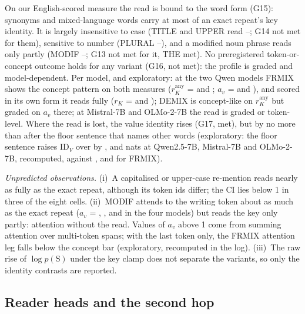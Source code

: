On our English-scored measure the read is bound to the word form (G15): synonyms and mixed-language words carry at most \GfifteenRKMax{} of an exact repeat's key identity. It is largely insensitive to case (TITLE and UPPER read \GfourteenCaseMin{}--\GfourteenCaseMax{}; G14 not met for them), sensitive to number (PLURAL \GfourteenPluralMin{}--\GfourteenPluralMax{}), and a modified noun phrase reads only partly (MODIF \GthirteenModifMin{}--\GthirteenModifMax{}; G13 not met for it, THE met). No preregistered token-or-concept outcome holds for any variant (G16, not met): the profile is graded and model-dependent. Per model, and exploratory: at the two Qwen models FRMIX shows the concept pattern on both measures ($r_K^{\mathrm{any}}$ = \GdRKanyFrmixQwenSeven{} and \GdRKanyFrmixQwenFourteen{}; $a_v$ = \GdAvFrmixQwenSeven{} and \GdAvFrmixQwenFourteen{}), and scored in its own form it reads fully ($r_K$ = \GdRKformFrmixQwenSeven{} and \GdRKformFrmixQwenFourteen{}); DEMIX is concept-like on $r_K^{\mathrm{any}}$ but graded on $a_v$ there; at Mistral-7B and OLMo-2-7B the read is graded or token-level. Where the read is lost, the value identity rises (G17, met), but by no more than after the floor sentence that names other words (exploratory: the floor sentence raises $\mathrm{ID}_V$ over \fmtPost{} by \GdOtherCompQwenSeven{}, \GdOtherCompMistralSeven{} and \GdOtherCompOlmoSeven{} nats at Qwen2.5-7B, Mistral-7B and OLMo-2-7B, recomputed, against \GseventeenFrmixQwenSeven{}, \GseventeenFrmixMistralSeven{} and \GseventeenFrmixOlmoSeven{} for FRMIX).

\emph{Unpredicted observations.} (i)~A capitalised or upper-case re-mention reads nearly as fully as the exact repeat, although its token ids differ; the CI lies below 1 in three of the eight cells. (ii)~MODIF attends to the writing token about as much as the exact repeat ($a_v$ = \GdAvModifQwenSeven{}, \GdAvModifQwenFourteen{}, \GdAvModifMistralSeven{} and \GdAvModifOlmoSeven{} in the four models) but reads the key only partly: attention without the read. Values of $a_v$ above 1 come from summing attention over multi-token spans; with the last token only, the FRMIX attention leg falls below the concept bar (exploratory, recomputed in the log). (iii)~The raw rise of $\log p(\mathrm{S})$ under the key clamp does not separate the variants, so only the identity contrasts are reported.

\subsection{Reader heads and the second hop}\label{app:heads}\label{sec:heads}\label{sec:role}\label{app:stage6}

